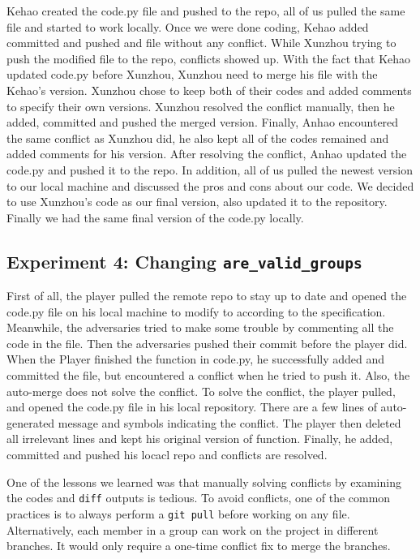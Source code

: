 \documentclass[titlepage, 12pt]{article}
\begin{document}
Kehao created the code.py file and pushed to the repo, all of us pulled the same
file and started to work locally. Once we were done coding, Kehao added
committed and pushed and file without any conflict. While Xunzhou trying to push
the modified file to the repo, conflicts showed up. With the fact that Kehao
updated code.py before Xunzhou, Xunzhou need to merge his file with the Kehao's
version. Xunzhou chose to keep both of their codes and added comments to specify
their own versions. Xunzhou resolved the conflict manually, then he added,
committed and pushed the merged version. Finally, Anhao encountered the same
conflict as Xunzhou did, he also kept all of the codes remained and added
comments for his version. After resolving the conflict, Anhao updated the
code.py and pushed it to the repo. In addition, all of us pulled the newest
version to our local machine and discussed the pros and cons about our code. We
decided to use Xunzhou's code as our final version, also updated it to the
repository. Finally we had the same final version of the code.py locally.

\subsection{Experiment 4: Changing \texttt{are\_valid\_groups}}

First of all, the player pulled the remote repo to stay up to date and opened
the code.py file on his local machine to modify to according to the
specification. Meanwhile, the adversaries tried to make some trouble by
commenting all the code in the file. Then the adversaries pushed their commit
before the player did. When the Player finished the function in code.py, he
successfully added and committed the file, but encountered a conflict when he
tried to push it. Also, the auto-merge does not solve the conflict. To solve the
conflict, the player pulled, and opened the code.py file in his local
repository. There are a few lines of auto-generated message and symbols
indicating the conflict. The player then deleted all irrelevant lines and kept
his original version of function. Finally, he added, committed and pushed his
locacl repo and conflicts are resolved.

One of the lessons we learned was that manually solving conflicts by examining
the codes and \texttt{diff} outputs is tedious. To avoid conflicts, one of the
common practices is to always perform a \texttt{git pull} before working on any
file. Alternatively, each member in a group can work on the project in different
branches. It would only require a one-time conflict fix to merge the branches.
\end{document}

